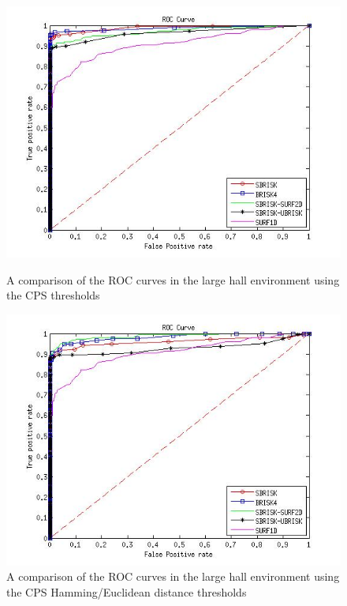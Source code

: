 \documentclass[11pt]{report}
\begin{document}
\begin{figure}[ht!]
\begin{minipage}[b]{0.5\linewidth}
\includegraphics[scale=0.4]{../Drawings/dataset3_ROC_General_KNN_Consistent.jpg}
\caption{A comparison of the ROC curves in the large hall environment using the CPS thresholds}
\label{fig:compareKnnConsistentOffice3}
\end{minipage}
\hspace{0.5cm}
\begin{minipage}[b]{0.5\linewidth}
\includegraphics[scale=0.4]{../Drawings/dataset3_ROC_General_Hamming_Consistent.jpg}
\caption{A comparison of the ROC curves in the large hall environment using the CPS Hamming/Euclidean distance thresholds}
\label{fig:compareHammingConsistentOffice3}
\end{minipage}
\end{figure}
\end{document}
